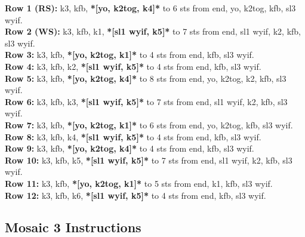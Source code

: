 \documentclass[12pt]{article}
\newcommand{\rowDir}[1]{\textbf{#1:}} %
\renewcommand{\repeat}[1]{\textbf{*[#1]*}} %
\begin{document}
\rowDir{Row 1 (RS)} k3, kfb, \repeat{yo, k2tog, k4} to 6 sts from end, yo, k2tog, kfb, sl3 wyif. \\
\rowDir{Row 2 (WS)} k3, kfb, k1, \repeat{sl1 wyif, k5} to 7 sts from end, sl1 wyif, k2, kfb, sl3 wyif. \\
\rowDir{Row 3} k3, kfb, \repeat{yo, k2tog, k1} to 4 sts from end, kfb, sl3 wyif. \\
\rowDir{Row 4} k3, kfb, k2, \repeat{sl1 wyif, k5} to 4 sts from end, kfb, sl3 wyif. \\
\rowDir{Row 5} k3, kfb, \repeat{yo, k2tog, k4} to 8 sts from end, yo, k2tog, k2, kfb, sl3 wyif. \\
\rowDir{Row 6} k3, kfb, k3, \repeat{sl1 wyif, k5} to 7 sts from end, sl1 wyif, k2, kfb, sl3 wyif. \\
\rowDir{Row 7} k3, kfb, \repeat{yo, k2tog, k1} to 6 sts from end, yo, k2tog, kfb, sl3 wyif. \\
\rowDir{Row 8} k3, kfb, k4, \repeat{sl1 wyif, k5} to 4 sts from end, kfb, sl3 wyif. \\
\rowDir{Row 9} k3, kfb, \repeat{yo, k2tog, k4} to 4 sts from end, kfb, sl3 wyif. \\
\rowDir{Row 10} k3, kfb, k5, \repeat{sl1 wyif, k5} to 7 sts from end, sl1 wyif, k2, kfb, sl3 wyif. \\
\rowDir{Row 11} k3, kfb, \repeat{yo, k2tog, k1} to 5 sts from end, k1, kfb, sl3 wyif. \\
\rowDir{Row 12} k3, kfb, k6, \repeat{sl1 wyif, k5} to 4 sts from end, kfb, sl3 wyif.

\subsection*{Mosaic 3 Instructions} %
\end{document}
